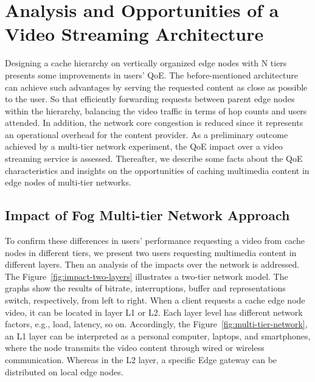 \section{Analysis and Opportunities of a Video Streaming Architecture}
\label{sec:system-archi}


Designing a cache hierarchy on vertically organized edge nodes with N tiers presents some improvements in users’ QoE. The before-mentioned architecture can achieve such advantages by serving the requested content as close as possible to the user. So that efficiently forwarding requests between parent edge nodes within the hierarchy, balancing the video traffic in terms of hop counts and users attended. In addition, the network core congestion is reduced since it represents an operational overhead for the content provider.
As a preliminary outcome achieved by a multi-tier network experiment, the QoE impact over a video streaming service is assessed. Thereafter, we describe some facts about the QoE characteristics and insights on the opportunities of caching multimedia content in edge nodes of multi-tier networks.

\subsection{Impact of Fog Multi-tier Network Approach}

To confirm these differences in users' performance requesting a video from cache nodes in different tiers, we present two users requesting multimedia content in different layers. Then an analysis of the impacts over the network is addressed. The Figure~\ref{fig:impact-two-layers} illustrates a two-tier network model. The graphs show the results of bitrate, interruptions, buffer and representations switch, respectively, from left to right.%
When a client requests a cache edge node video, it can be located in layer L1 or L2. Each layer level has different network factors, e.g., load, latency, so on. Accordingly, the Figure~\ref{fig:multi-tier-network}, an L1 layer can be interpreted as a personal computer, laptops, and smartphones, where the node transmits the video content through wired or wireless communication. Whereas in the L2 layer, a specific Edge gateway can be distributed on local edge nodes.

